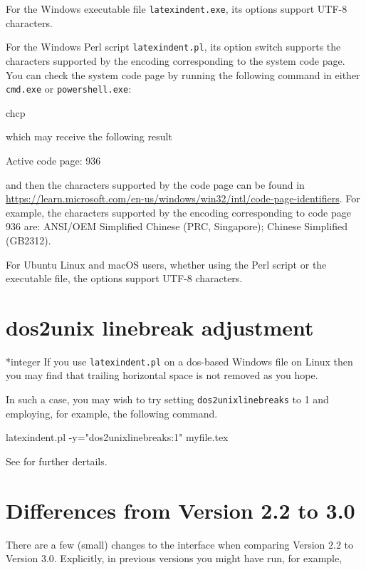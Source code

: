 \documentclass[10pt]{article}
\begin{document}
  For the Windows executable file \texttt{latexindent.exe}, its options support UTF-8
  characters.

  For the Windows Perl script \texttt{latexindent.pl}, its option switch supports the
  characters supported by the encoding corresponding to the system code page. You can
  check the system code page by running the following command in either \texttt{cmd.exe}
  or \texttt{powershell.exe}:
  \begin{dosprompt}
  chcp
  \end{dosprompt}
  which may receive the following result
  \begin{dosprompt}
  Active code page: 936
  \end{dosprompt}
  and then the characters supported by the code page can be found in \href{Microsoft's
  code page identifier
  table}{https://learn.microsoft.com/en-us/windows/win32/intl/code-page-identifiers}. For
  example, the characters supported by the encoding corresponding to code page 936 are:
  ANSI/OEM Simplified Chinese (PRC, Singapore); Chinese Simplified (GB2312).

  For Ubuntu Linux and macOS users, whether using the Perl script or the executable file,
  the options support UTF-8 characters.

 \section{dos2unix linebreak adjustment}

 *{integer}
  If you use \texttt{latexindent.pl} on a dos-based Windows file on Linux
   then you may find that trailing horizontal
  space is not removed as you hope.

  In such a case, you may wish to try setting \texttt{dos2unixlinebreaks} to 1 and
  employing, for example, the following command.

  \begin{commandshell}
latexindent.pl -y="dos2unixlinebreaks:1" myfile.tex
\end{commandshell}

  See \cite{bersbersbers} for further dertails.

 \section{Differences from Version 2.2 to 3.0}\label{app:differences}
  There are a few (small) changes to the interface when comparing Version 2.2 to Version
  3.0. Explicitly, in previous versions you might have run, for example,
\end{document}
